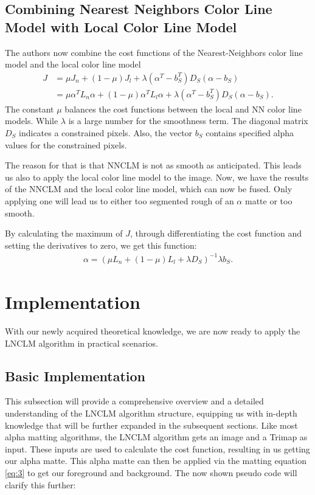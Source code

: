 \subsection{Combining Nearest Neighbors Color Line Model with Local Color Line Model}

The authors now combine the cost functions of the Nearest-Neighbors color line model and the local color line model
\begin{align}
	J & = \mu J_n + (1 - \mu) J_l + \lambda(\alpha^T - b^T_S )D_S(\alpha - b_S)\\ 
	& = \mu \alpha^T L_n \alpha + (1 - \mu)\alpha^T L_l \alpha + \lambda(\alpha^T - b_S^T)D_S(\alpha - b_S) .
\end{align} 
The constant \(\mu\) balances the cost functions between the local and NN color line models. While \(\lambda\) is a large number for the smoothness term. The diagonal matrix \(D_S\) indicates a constrained pixels. Also, the vector \(b_S\) contains specified alpha values for the constrained pixels. 

The reason for that is that NNCLM is not as smooth as anticipated. This leads us also to apply the local color line model to the image. Now, we have the results of the NNCLM and the local color line model, which can now be fused. Only applying one will lead us to either too segmented rough of an $\alpha$ matte or too smooth.

By calculating the maximum of \(J\), through differentiating the cost function and setting the derivatives to zero, we get this function: 
\begin{align}\label{eq:40}
	\alpha = (\mu L_n + (1 - \mu) L_l + \lambda D_S)^{-1} \lambda b_S .
\end{align} 



\section{Implementation}
With our newly acquired theoretical knowledge, we are now ready to apply the LNCLM algorithm in practical scenarios.

\subsection{Basic Implementation}
This subsection will provide a comprehensive overview and a detailed understanding of the LNCLM algorithm structure, equipping us with in-depth knowledge that will be further expanded in the subsequent sections.
Like most alpha matting algorithms, the LNCLM algorithm gets an image and a Trimap as input. These inputs are used to calculate the cost function, resulting in us getting our alpha matte. 
This alpha matte can then be applied via the matting equation \ref{eq:3} to get our foreground and background. The now shown pseudo code will clarify this further:


